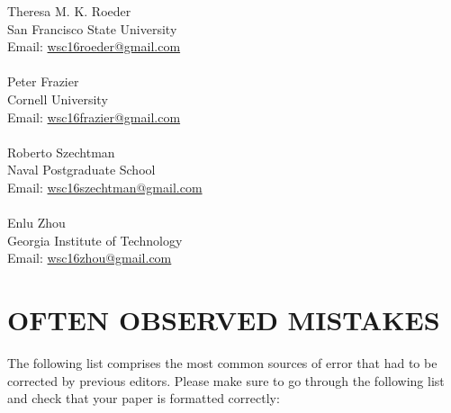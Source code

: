 \documentclass{wscpaperproc}
\theoremstyle{wsc}
\begin{document}
\noindent Theresa M. K. Roeder\\
San Francisco State University\\
Email: \href{mailto://wsc16roeder@gmail.com}{wsc16roeder@gmail.com}\\
\\
Peter Frazier\\
Cornell University\\
Email: \href{mailto://wsc16frazier@gmail.com}{wsc16frazier@gmail.com}\\
\\
Roberto Szechtman\\
Naval Postgraduate School\\
Email: \href{mailto://wsc16szechtman@gmail.com}{wsc16szechtman@gmail.com}\\
\\
Enlu Zhou\\
Georgia Institute of Technology\\
Email: \href{mailto://wsc16zhou@gmail.com}{wsc16zhou@gmail.com}\\

\section{OFTEN OBSERVED MISTAKES}

The following list comprises the most common sources of error that had to be corrected by previous editors. Please make sure to go through the following list and check that your paper is formatted correctly:
\end{document}
